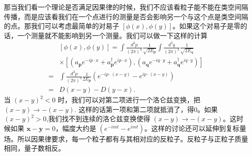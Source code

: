 那当我们看一个理论是否满足因果律的时候，我们不应该看粒子能不能在类空间隔传播，而是应该看我们在一个点进行的测量是否会影响另一个与这个点是类空间隔的点。那我们可以考虑最简单的对易子 $[\phi(x),\phi(y)]$。如果这个对易子是零的话，一个测量就不能影响到另一个测量。我们可以做一下这样的计算
\begin{equation}
\begin{aligned}
&[\phi(x), \phi(y)]=\int \frac{d^{3} p}{(2 \pi)^{3}} \frac{1}{\sqrt{2 E_{\mathbf{p}}}} \int \frac{d^{3} q}{(2 \pi)^{3}} \frac{1}{\sqrt{2 E_{\mathbf{q}}}} \\
&\times\left[\left(a_{\mathbf{p}} e^{-i p \cdot x}+a_{\mathbf{p}}^{\dagger} e^{i p \cdot x}\right),\left(a_{\mathbf{q}} e^{-i q \cdot y}+a_{\mathbf{q}}^{\dagger} e^{i q \cdot y}\right)\right] \\
=& \int \frac{d^{3} p}{(2 \pi)^{3}} \frac{1}{2 E_{\mathbf{p}}}\left(e^{-i p \cdot(x-y)}-e^{i p \cdot(x-y)}\right) \\
=& D(x-y)-D(y-x) .
\end{aligned}
\end{equation}
当 $(x-y)^2<0$ 时，我们可以对第二项进行一个洛仑兹变换，把 $(x-y)\rightarrow -(x-y)$. 这样的话第一项和第二项就抵消了，得0。如果 $(x-y)^2>0$,我们找不到连续的洛仑兹变换使得 $(x-y)\rightarrow - (x-y)$。这时候如果 $\mathbf x - \mathbf y = 0$，幅度大约是 $(e^{-imt}-e^{imt})$。这样的讨论还可以延伸到复标量场。所以因果律要求，每一个粒子都有与其相对应的反粒子。反粒子与正粒子质量相同，量子数相反。



